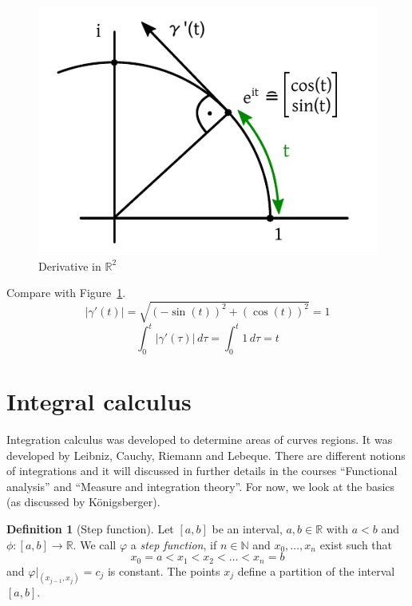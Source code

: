 \documentclass[a4paper,landscape,twocolumn]{article}
\theoremstyle{definition}
\newtheorem{defi}{Definition}
\newcommand\abs[1]{\left|#1\right|}
\begin{document}
\begin{figure}[!h]
  \begin{center}
    \includegraphics{img/derivative-in-r2.pdf}
    \caption{Derivative in $\mathbb R^2$}
    \label{img:deriv-r2}
  \end{center}
\end{figure}

Compare with Figure~\ref{img:deriv-r2}.
\[ \abs{\gamma'(t)} = \sqrt{(-\sin(t))^2 + (\cos(t))^2} = 1 \]
\[ \int_0^t \abs{\gamma'(\tau)} \, d\tau = \int_0^t 1 \, d\tau = t \]

\section{Integral calculus}
%
Integration calculus was developed to determine areas of curves regions.
It was developed by Leibniz, Cauchy, Riemann and Lebeque. There are different
notions of integrations and it will discussed in further details in the courses
\enquote{Functional analysis} and \enquote{Measure and integration theory}.
For now, we look at the basics (as discussed by \foreignlanguage{ngerman}{Königsberger}).

\begin{defi}[Step function]
  Let $[a,b]$ be an interval, $a,b \in \mathbb R$ with $a<b$ and $\phi: [a,b] \to \mathbb R$.
  We call $\varphi$ a \emph{step function}, if $n \in \mathbb N$ and $x_0, \ldots, x_n$
  exist such that
  \[ x_0 = a < x_1 < x_2 < \ldots < x_n = b \]
  and $\varphi|_{(x_{j-1}, x_j)} = c_j$ is constant.
  The points $x_j$ define a partition of the interval $[a,b]$.
\end{defi}
\end{document}
